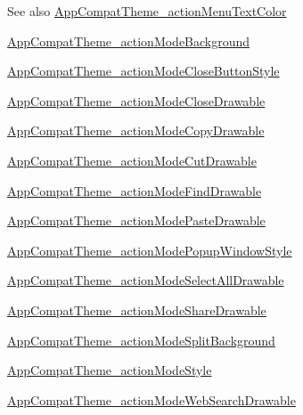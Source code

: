 \begin{DoxySeeAlso}{See also}
\hyperlink{classandroid_1_1support_1_1design_1_1R_1_1styleable_a156db0d0e55cd2febf73892e2d0e20ad}{App\+Compat\+Theme\+\_\+action\+Menu\+Text\+Color} 

\hyperlink{classandroid_1_1support_1_1design_1_1R_1_1styleable_a558b51abb51bf7789c77678e8251a2e1}{App\+Compat\+Theme\+\_\+action\+Mode\+Background} 

\hyperlink{classandroid_1_1support_1_1design_1_1R_1_1styleable_a140f9d445f81bdf8ba5f95c0542ca529}{App\+Compat\+Theme\+\_\+action\+Mode\+Close\+Button\+Style} 

\hyperlink{classandroid_1_1support_1_1design_1_1R_1_1styleable_aac470b6ebccb4d44a9441e2ca1de77dc}{App\+Compat\+Theme\+\_\+action\+Mode\+Close\+Drawable} 

\hyperlink{classandroid_1_1support_1_1design_1_1R_1_1styleable_afef45b44846fb895b555dc4c25849622}{App\+Compat\+Theme\+\_\+action\+Mode\+Copy\+Drawable} 

\hyperlink{classandroid_1_1support_1_1design_1_1R_1_1styleable_aa4f155cf001a007b34829305ec1b8bf4}{App\+Compat\+Theme\+\_\+action\+Mode\+Cut\+Drawable} 

\hyperlink{classandroid_1_1support_1_1design_1_1R_1_1styleable_a87e11e5ef34e5a6b9426ee90ef001590}{App\+Compat\+Theme\+\_\+action\+Mode\+Find\+Drawable} 

\hyperlink{classandroid_1_1support_1_1design_1_1R_1_1styleable_af873cad74307d6ae72d31314ebb7eb9d}{App\+Compat\+Theme\+\_\+action\+Mode\+Paste\+Drawable} 

\hyperlink{classandroid_1_1support_1_1design_1_1R_1_1styleable_af493b8a4fc8e112fffaddcdef4b737bb}{App\+Compat\+Theme\+\_\+action\+Mode\+Popup\+Window\+Style} 

\hyperlink{classandroid_1_1support_1_1design_1_1R_1_1styleable_aaf0de120209af4d10c6850f628fc12b1}{App\+Compat\+Theme\+\_\+action\+Mode\+Select\+All\+Drawable} 

\hyperlink{classandroid_1_1support_1_1design_1_1R_1_1styleable_a5cc3bc3db3f4a7934ec84ad88a523f1a}{App\+Compat\+Theme\+\_\+action\+Mode\+Share\+Drawable} 

\hyperlink{classandroid_1_1support_1_1design_1_1R_1_1styleable_a4b4b91c68eff93edcf95cbb4b498cfeb}{App\+Compat\+Theme\+\_\+action\+Mode\+Split\+Background} 

\hyperlink{classandroid_1_1support_1_1design_1_1R_1_1styleable_a6065b230562d4a76f8d2d8990f30a339}{App\+Compat\+Theme\+\_\+action\+Mode\+Style} 

\hyperlink{classandroid_1_1support_1_1design_1_1R_1_1styleable_a3150922f00e1e78287f30e03ef037a0a}{App\+Compat\+Theme\+\_\+action\+Mode\+Web\+Search\+Drawable} 


\end{DoxySeeAlso}
